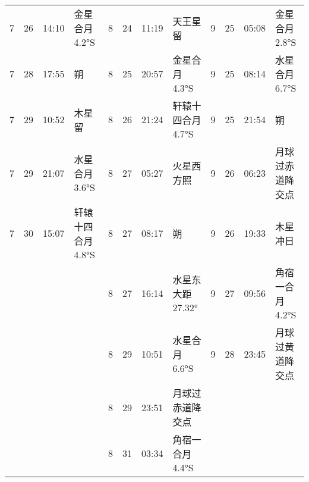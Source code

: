 \begin{tabular}{llll|llll|llll}
7 & 26 & 14:10 & 金星合月 4.2°S & 8 & 24 & 11:19 & 天王星留 & 9 & 25 & 05:08 & 金星合月 2.8°S \tabularnewline
7 & 28 & 17:55 & 朔 & 8 & 25 & 20:57 & 金星合月 4.3°S & 9 & 25 & 08:14 & 水星合月 6.7°S \tabularnewline
7 & 29 & 10:52 & 木星留 & 8 & 26 & 21:24 & 轩辕十四合月 4.7°S & 9 & 25 & 21:54 & 朔 \tabularnewline
7 & 29 & 21:07 & 水星合月 3.6°S & 8 & 27 & 05:27 & 火星西方照 & 9 & 26 & 06:23 & 月球过赤道降交点 \tabularnewline
7 & 30 & 15:07 & 轩辕十四合月 4.8°S & 8 & 27 & 08:17 & 朔 & 9 & 26 & 19:33 & 木星冲日 \tabularnewline
 &  &  &  & 8 & 27 & 16:14 & 水星东大距 27.32° & 9 & 27 & 09:56 & 角宿一合月 4.2°S \tabularnewline
 &  &  &  & 8 & 29 & 10:51 & 水星合月 6.6°S & 9 & 28 & 23:45 & 月球过黄道降交点 \tabularnewline
 &  &  &  & 8 & 29 & 23:51 & 月球过赤道降交点 &  &  &  &  \tabularnewline
 &  &  &  & 8 & 31 & 03:34 & 角宿一合月 4.4°S &  &  &  &  \tabularnewline
\hline \end{tabular}

